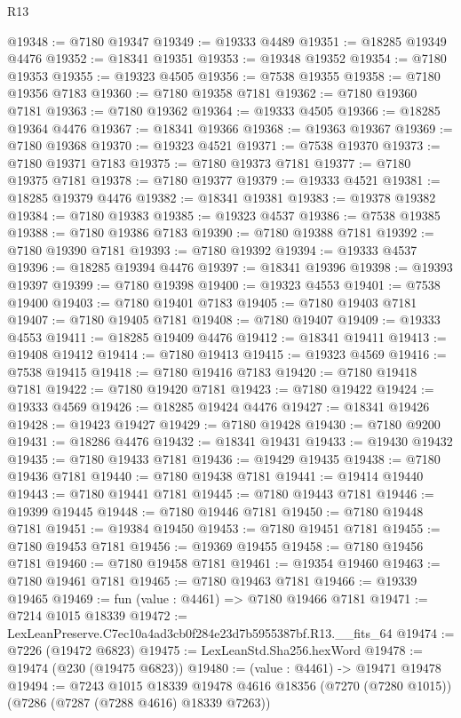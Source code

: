\begin{lexlean}{R13}
\begin{coremodule}
@19348 := @7180 @19347
@19349 := @19333 @4489
@19351 := @18285 @19349 @4476
@19352 := @18341 @19351
@19353 := @19348 @19352
@19354 := @7180 @19353
@19355 := @19323 @4505
@19356 := @7538 @19355
@19358 := @7180 @19356 @7183
@19360 := @7180 @19358 @7181
@19362 := @7180 @19360 @7181
@19363 := @7180 @19362
@19364 := @19333 @4505
@19366 := @18285 @19364 @4476
@19367 := @18341 @19366
@19368 := @19363 @19367
@19369 := @7180 @19368
@19370 := @19323 @4521
@19371 := @7538 @19370
@19373 := @7180 @19371 @7183
@19375 := @7180 @19373 @7181
@19377 := @7180 @19375 @7181
@19378 := @7180 @19377
@19379 := @19333 @4521
@19381 := @18285 @19379 @4476
@19382 := @18341 @19381
@19383 := @19378 @19382
@19384 := @7180 @19383
@19385 := @19323 @4537
@19386 := @7538 @19385
@19388 := @7180 @19386 @7183
@19390 := @7180 @19388 @7181
@19392 := @7180 @19390 @7181
@19393 := @7180 @19392
@19394 := @19333 @4537
@19396 := @18285 @19394 @4476
@19397 := @18341 @19396
@19398 := @19393 @19397
@19399 := @7180 @19398
@19400 := @19323 @4553
@19401 := @7538 @19400
@19403 := @7180 @19401 @7183
@19405 := @7180 @19403 @7181
@19407 := @7180 @19405 @7181
@19408 := @7180 @19407
@19409 := @19333 @4553
@19411 := @18285 @19409 @4476
@19412 := @18341 @19411
@19413 := @19408 @19412
@19414 := @7180 @19413
@19415 := @19323 @4569
@19416 := @7538 @19415
@19418 := @7180 @19416 @7183
@19420 := @7180 @19418 @7181
@19422 := @7180 @19420 @7181
@19423 := @7180 @19422
@19424 := @19333 @4569
@19426 := @18285 @19424 @4476
@19427 := @18341 @19426
@19428 := @19423 @19427
@19429 := @7180 @19428
@19430 := @7180 @9200
@19431 := @18286 @4476
@19432 := @18341 @19431
@19433 := @19430 @19432
@19435 := @7180 @19433 @7181
@19436 := @19429 @19435
@19438 := @7180 @19436 @7181
@19440 := @7180 @19438 @7181
@19441 := @19414 @19440
@19443 := @7180 @19441 @7181
@19445 := @7180 @19443 @7181
@19446 := @19399 @19445
@19448 := @7180 @19446 @7181
@19450 := @7180 @19448 @7181
@19451 := @19384 @19450
@19453 := @7180 @19451 @7181
@19455 := @7180 @19453 @7181
@19456 := @19369 @19455
@19458 := @7180 @19456 @7181
@19460 := @7180 @19458 @7181
@19461 := @19354 @19460
@19463 := @7180 @19461 @7181
@19465 := @7180 @19463 @7181
@19466 := @19339 @19465
@19469 := fun (value : @4461) => @7180 @19466 @7181
@19471 := @7214 @1015 @18339
@19472 := LexLeanPreserve.C7ec10a4ad3cb0f284e23d7b5955387bf.R13.__fits_64
@19474 := @7226 (@19472 @6823)
@19475 := LexLeanStd.Sha256.hexWord
@19478 := @19474 (@230 (@19475 @6823))
@19480 := (value : @4461) -> @19471 @19478
@19494 := @7243
    @1015
    @18339
    @19478
    @4616
    @18356
    (@7270 (@7280 @1015))
    (@7286 (@7287 (@7288 @4616) @18339 @7263))

\end{coremodule}
\end{lexlean}
